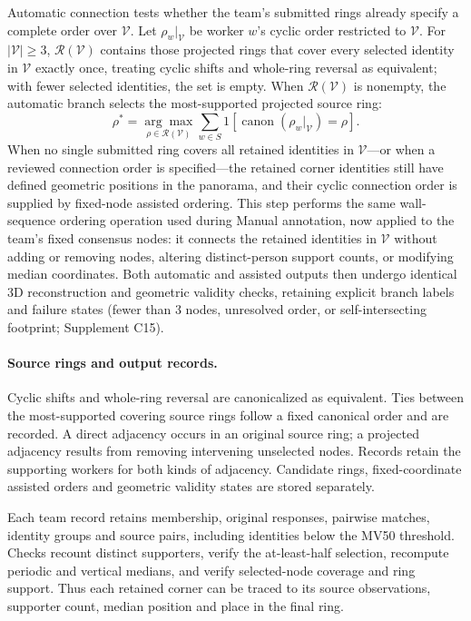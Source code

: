 Automatic connection tests whether the team's submitted rings already specify a complete order over \(\mathcal V\). Let \(\rho_w|_{\mathcal V}\) be worker \(w\)'s cyclic order restricted to \(\mathcal V\). For \(|\mathcal V|\geq3\), \(\mathcal R(\mathcal V)\) contains those projected rings that cover every selected identity in \(\mathcal V\) exactly once, treating cyclic shifts and whole-ring reversal as equivalent; with fewer selected identities, the set is empty. When \(\mathcal R(\mathcal V)\) is nonempty, the automatic branch selects the most-supported projected source ring:
\begin{equation}
 \rho^*=\underset{\rho\in\mathcal R(\mathcal V)}{\arg\max}
 \sum_{w\in S}\mathrm{1}\!\left[
 \operatorname{canon}(\rho_w|_{\mathcal V})=\rho\right].
 \label{eq:ring}
\end{equation}
When no single submitted ring covers all retained identities in \(\mathcal V\)---or when a reviewed connection order is specified---the retained corner identities still have defined geometric positions in the panorama, and their cyclic connection order is supplied by fixed-node assisted ordering. This step performs the same wall-sequence ordering operation used during Manual annotation, now applied to the team's fixed consensus nodes: it connects the retained identities in \(\mathcal V\) without adding or removing nodes, altering distinct-person support counts, or modifying median coordinates. Both automatic and assisted outputs then undergo identical 3D reconstruction and geometric validity checks, retaining explicit branch labels and failure states (fewer than 3 nodes, unresolved order, or self-intersecting footprint; Supplement C15).


\paragraph{Source rings and output records.}
Cyclic shifts and whole-ring reversal are canonicalized as equivalent.
Ties between the most-supported covering source rings follow a fixed
canonical order and are recorded. A direct adjacency occurs in an original
source ring; a projected adjacency results from removing intervening
unselected nodes. Records retain the supporting workers for both kinds of
adjacency. Candidate rings, fixed-coordinate assisted orders and geometric
validity states are stored separately.

Each team record retains membership, original responses, pairwise matches,
identity groups and source pairs, including identities below the MV50
threshold. Checks recount distinct supporters, verify the at-least-half
selection, recompute periodic and vertical medians, and verify selected-node
coverage and ring support. Thus each retained corner can be traced to its
source observations, supporter count, median position and place in the final ring.

